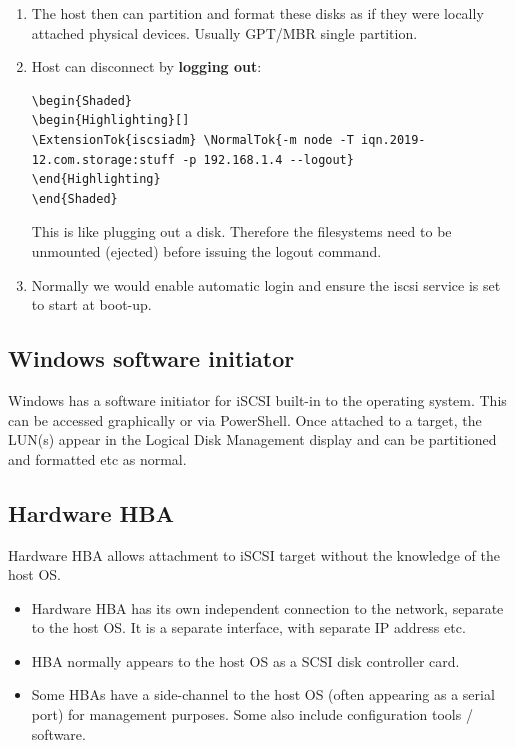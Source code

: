 \begin{enumerate}
  Assuming the login step is successful, the LUNs on the target will
  appear as locally attached SCSI disks. So they will appear in
  \texttt{/dev} directory as \texttt{/dev/sd?} where ? is the drive
  letter.
\item
  The host then can partition and format these disks as if they were
  locally attached physical devices. Usually GPT/MBR single partition.
\item
  Host can disconnect by \textbf{logging out}:

\begin{verbatim}
\begin{Shaded}
\begin{Highlighting}[]
\ExtensionTok{iscsiadm} \NormalTok{-m node -T iqn.2019-12.com.storage:stuff -p 192.168.1.4 --logout}
\end{Highlighting}
\end{Shaded}
\end{verbatim}

  This is like plugging out a disk. Therefore the filesystems need to be
  unmounted (ejected) before issuing the logout command.
\item
  Normally we would enable automatic login and ensure the iscsi service
  is set to start at boot-up.
\end{enumerate}

\subsection{Windows software
initiator}\label{windows-software-initiator}

Windows has a software initiator for iSCSI built-in to the operating
system. This can be accessed graphically or via PowerShell. Once
attached to a target, the LUN(s) appear in the Logical Disk Management
display and can be partitioned and formatted etc as normal.

\subsection{Hardware HBA}\label{hardware-hba}

Hardware HBA allows attachment to iSCSI target without the knowledge of
the host OS.

\begin{itemize}
\item
  Hardware HBA has its own independent connection to the network,
  separate to the host OS. It is a separate interface, with separate IP
  address etc.
\item
  HBA normally appears to the host OS as a SCSI disk controller card.
\item
  Some HBAs have a side-channel to the host OS (often appearing as a
  serial port) for management purposes. Some also include configuration
  tools / software.
\end{itemize}

